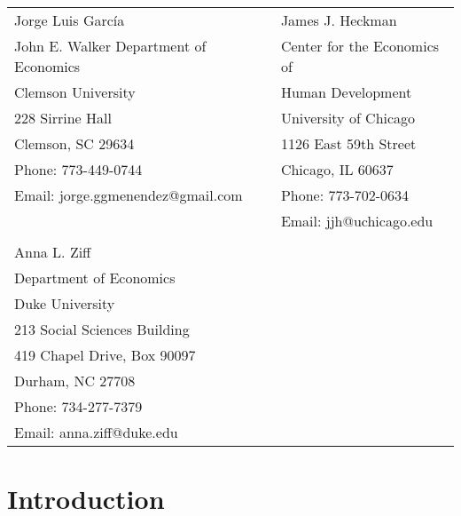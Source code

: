 \bigskip
\begin{tabular}{ll}
Jorge Luis Garc\'{i}a                                       & James J. Heckman \\
John E. Walker Department of Economics                                & Center for the Economics of  \\
Clemson University                                       & Human Development  \\
228 Sirrine Hall                                     & University of Chicago \\
Clemson, SC 29634                                           & 1126 East 59th Street \\
Phone: 773-449-0744                                    & Chicago, IL 60637 \\
Email: jorge.ggmenendez@gmail.com                       & Phone: 773-702-0634  \\
									& Email: jjh@uchicago.edu \\
                                                                       & \\
Anna L. Ziff                                         &  \\
Department of Economics & \\
Duke University                                        &  \\
213 Social Sciences Building                      & \\
419 Chapel Drive, Box 90097                     & \\
Durham, NC 27708                                              &       \\
Phone: 734-277-7379                                    &  \\
Email: anna.ziff@duke.edu                     &  \\

\end{tabular}

\clearpage

\restoregeometry
\doublespacing


\setcounter{page}{0}

\setlength\parindent{0pt}
\setlength{\parskip}{10pt}

\section{Introduction}
\label{sec:introduction}
	

